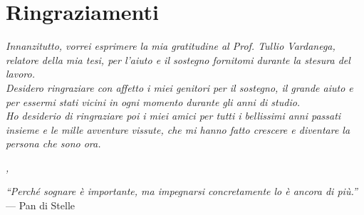 
\cleardoublepage
{}
{}

\begingroup
\let\clearpage\relax
\let\cleardoublepage\relax
\let\cleardoublepage\relax

\chapter*{Ringraziamenti}

\noindent \textit{Innanzitutto, vorrei esprimere la mia gratitudine al Prof. Tullio Vardanega, relatore della mia tesi, per l'aiuto e il sostegno fornitomi durante la stesura del lavoro.}\\

\noindent \textit{Desidero ringraziare con affetto i miei genitori per il sostegno, il grande aiuto e per essermi stati vicini in ogni momento durante gli anni di studio.}\\

\noindent \textit{Ho desiderio di ringraziare poi i miei amici per tutti i bellissimi anni passati insieme e le mille avventure vissute, che mi hanno fatto crescere e diventare la persona che sono ora.}\\
\bigskip

\noindent\textit{\myLocation, \myTime}
\hfill \myName

\vspace{250pt}
\begin{flushright}{
		\slshape    
		``Perché sognare è importante, ma impegnarsi concretamente lo è ancora di più.''  \medskip} \\ 
	\medskip
	--- Pan di Stelle
\end{flushright}
\endgroup

